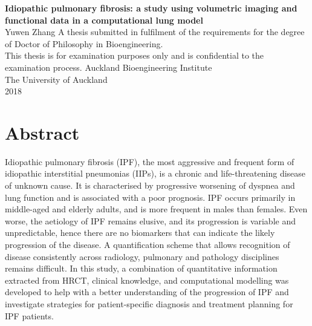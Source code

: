 \documentclass[a4paper, 12pt]{book}
\begin{document}
\frontmatter

\begin{titlepage}
  \begin{center}
    \vfill
    {\Large \textbf{Idiopathic pulmonary fibrosis: a study using volumetric imaging and functional data in a computational lung model}} %
    \\[6cm]
    Yuwen Zhang
    \vfill
    \normalsize A thesis submitted in fulfilment of the requirements for the degree of Doctor of Philosophy in Bioengineering. \\[1cm]
    This thesis is for examination purposes only and is confidential to the examination process.
    \vfill
    Auckland Bioengineering Institute
    \\[0.8cm] The University of Auckland
    \\[0.8cm] 2018
  \end{center}
\end{titlepage}

\cleardoublepage
\chapter*{Abstract}
Idiopathic pulmonary fibrosis (IPF), the most aggressive and frequent form of idiopathic interstitial pneumonias (IIPs), is a chronic and life-threatening disease of unknown cause. It is characterised by progressive worsening of dyspnea and lung function and is associated with a poor prognosis. IPF occurs primarily in middle-aged and elderly adults, and is more frequent in males than females. Even worse, the aetiology of IPF remains elusive, and its progression is variable and unpredictable, hence there are no biomarkers that can indicate the likely progression of the disease. A quantification scheme that allows recognition of disease consistently across radiology, pulmonary and pathology disciplines remains difficult. In this study, a combination of quantitative information extracted from HRCT, clinical knowledge, and computational modelling was developed to help with a better understanding of the progression of IPF and investigate strategies for patient-specific diagnosis and treatment planning for IPF patients.
\end{document}
